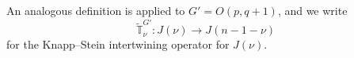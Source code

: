\documentclass[reqno,12pt]{pja00} %
\newcommand{\Hom}{\mbox{\normalfont Hom}}
\newcommand{\Sol}{\mathcal{S}\!{\it ol}}
\theoremstyle{definition}
\newtheorem{definition}[theorem]{Definition}
\theoremstyle{exampstyle} \newtheorem{examp}[theorem]{Theorem}
\renewcommand{\Q}{Q_{p,q}}
\newcommand{\teven}{\mbox{\textrm{: even}}}
\newcommand{\todd}{\mbox{\textrm{: odd}}}
\begin{document}
	An analogous definition is applied to $G'=O(p,q+1)$, and we write\begin{equation*}
		\tilde{\mathbb{T}}_{\nu}^{G'}:J(\nu)\to J(n-1-\nu)
	\end{equation*}for the Knapp--Stein intertwining operator for $J(\nu)$.
\end{document}
